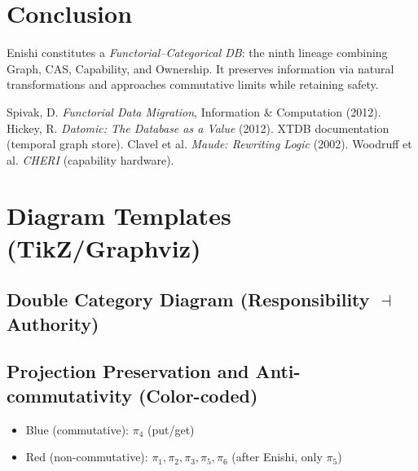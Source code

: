 \documentclass[10pt]{article}
\begin{document}
\section{Conclusion}
Enishi constitutes a \emph{Functorial--Categorical DB}: the ninth lineage combining Graph, CAS, Capability, and Ownership.
It preserves information via natural transformations and approaches commutative limits while retaining safety.

\begin{thebibliography}{9}
 Spivak, D. \emph{Functorial Data Migration}, Information \& Computation (2012).
 Hickey, R. \emph{Datomic: The Database as a Value} (2012).
 XTDB documentation (temporal graph store).
 Clavel et al. \emph{Maude: Rewriting Logic} (2002).
 Woodruff et al. \emph{CHERI} (capability hardware).
\end{thebibliography}

\appendix
\section{Diagram Templates (TikZ/Graphviz)}

\subsection{Double Category Diagram (Responsibility $\dashv$ Authority)}


\subsection{Projection Preservation and Anti-commutativity (Color-coded)}
\begin{itemize}
    \item Blue (commutative): $\pi_4$ (put/get)
    \item Red (non-commutative): $\pi_1,\pi_2,\pi_3,\pi_5,\pi_6$ (after Enishi, only $\pi_5$)
\end{itemize}
\end{document}
